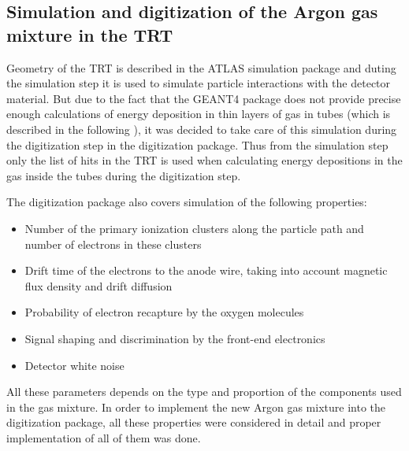 \subsection{Simulation and digitization of the Argon gas mixture in the TRT}
\label{subsec:TRT:argonImpl}


Geometry of the TRT is described in the ATLAS simulation package and duting the simulation step it is used to simulate particle interactions with the detector material.
But due to the fact that the GEANT4 package does not provide precise enough calculations of energy deposition in thin layers of gas in tubes 
(which is described in the following ), it was decided to take care of this simulation during the digitization step in the digitization package.
Thus from the simulation step only the list of hits in the TRT is used when calculating energy depositions in the gas inside the tubes during the digitization step.

The digitization package also covers simulation of the following properties:
\begin{itemize}
 \item Number of the primary ionization clusters along the particle path and number of electrons in these clusters
 \item Drift time of the electrons to the anode wire, taking into account magnetic flux density and drift diffusion
 \item Probability of electron recapture by the oxygen molecules
 \item Signal shaping and discrimination by the front-end electronics
 \item Detector white noise
\end{itemize}

All these parameters depends on the type and proportion of the components used in the gas mixture. 
In order to implement the new Argon gas mixture into the digitization package, all these properties were considered in detail 
and proper implementation of all of them was done.

